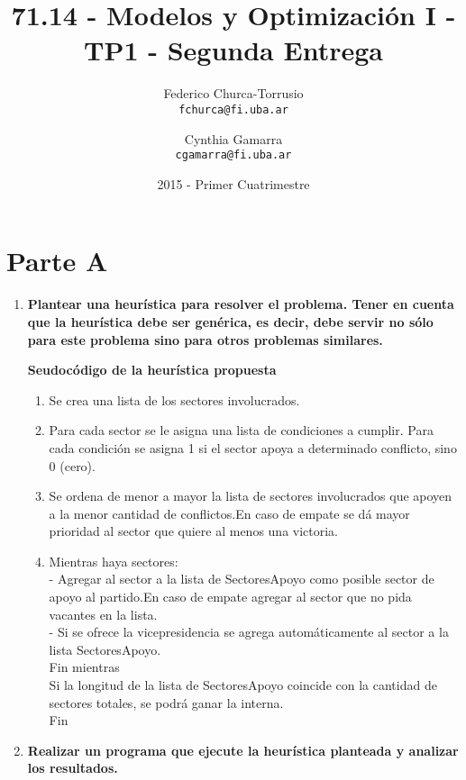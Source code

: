 \documentclass[10pt, a4paper, titlepage,
	oneside,
	fleqn, leqno]{article}
\title{71.14 - Modelos y Optimización I - TP1 - Segunda Entrega}
\author{
	Federico Churca-Torrusio \\\texttt{fchurca@fi.uba.ar}
	\and
	Cynthia Gamarra \\\texttt{cgamarra@fi.uba.ar}}
\date{2015 - Primer Cuatrimestre}
\let\oldsection\section
\def\section{\cleardoublepage\oldsection}
\begin{document}
\maketitle

\cleardoublepage
{}
\setcounter{page}{1}

\section{Parte A}
\begin{enumerate} [a .]
\item \textbf{Plantear una heurística para resolver el problema. Tener en cuenta que la heurística debe ser genérica, es decir, debe servir no sólo para este problema sino para otros problemas similares.}\\
\begin{center}
\textbf{Seudocódigo de la heurística propuesta}
\end{center}
\begin{enumerate}
\item Se crea una lista de los sectores involucrados.
\item Para cada sector se le asigna una lista de condiciones a cumplir. Para cada condición se asigna 1 si el sector apoya a determinado conflicto, sino 0 (cero).
\item Se ordena de menor a mayor la lista de sectores involucrados que apoyen a la menor cantidad de conflictos.En caso de empate se dá mayor prioridad al sector que quiere al menos una victoria.
\item Mientras haya sectores:\\
 - Agregar al sector a la lista de SectoresApoyo como posible sector de apoyo al partido.En caso de empate agregar al sector que no pida vacantes en la lista.\\
 - Si se ofrece la vicepresidencia se agrega automáticamente al sector a la lista SectoresApoyo.\\
 Fin mientras\\
 Si la longitud de la lista de SectoresApoyo coincide con la cantidad de sectores totales, se podrá ganar la interna.\\
 Fin
\end{enumerate}

\item \textbf{Realizar un programa que ejecute la heurística planteada y analizar los resultados.}



\end{enumerate}
\end{document}
